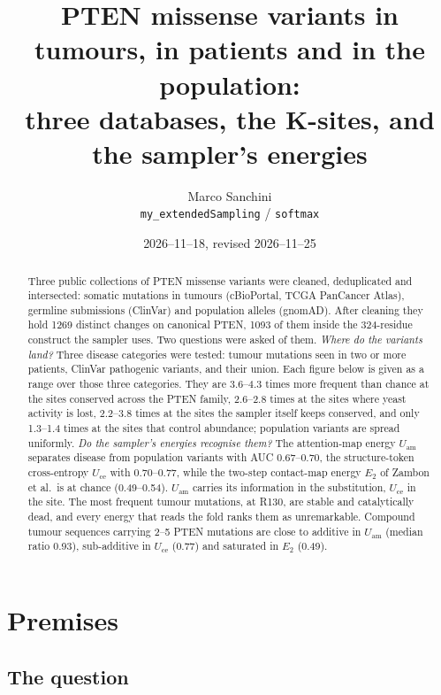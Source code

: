 \documentclass[11pt,a4paper]{article}
\title{PTEN missense variants in tumours, in patients and in the population:\\
three databases, the K-sites, and the sampler's energies}
\author{Marco Sanchini \\ \small\texttt{my\_extendedSampling} / \texttt{softmax}}
\date{2026--11--18, revised 2026--11--25}
\newcommand{\Uam}{U_{\mathrm{am}}}
\newcommand{\Uce}{U_{\mathrm{ce}}}
\newcommand{\Etwo}{E_{2}}
\begin{document}
\maketitle

\begin{abstract}
\noindent
Three public collections of PTEN missense variants were cleaned, deduplicated
and intersected: somatic mutations in tumours (cBioPortal, TCGA PanCancer
Atlas), germline submissions (ClinVar) and population alleles (gnomAD). After
cleaning they hold 1269 distinct changes on canonical PTEN, 1093 of them inside
the 324-residue construct the sampler uses. Two questions were asked of them.
\emph{Where do the variants land?} Three disease categories were tested:
tumour mutations seen in two or more patients, ClinVar pathogenic variants,
and their union. Each figure below is given as a range over those three
categories. They are 3.6--4.3 times more frequent than chance at the sites
conserved across the PTEN family, 2.6--2.8 times at the sites where yeast
activity is lost, 2.2--3.8 times at the sites the sampler itself keeps
conserved, and only 1.3--1.4 times at the sites that control abundance;
population variants are spread uniformly. \emph{Do the sampler's energies
recognise them?} The attention-map energy $\Uam$ separates disease from
population variants with AUC 0.67--0.70, the structure-token cross-entropy
$\Uce$ with 0.70--0.77, while the two-step contact-map energy $\Etwo$ of Zambon
et al.\ is at chance (0.49--0.54). $\Uam$ carries its information in the
substitution, $\Uce$ in the site. The most frequent tumour mutations, at
R130, are stable and catalytically dead, and every energy that reads the fold
ranks them as unremarkable. Compound tumour sequences carrying 2--5 PTEN
mutations are close to additive in $\Uam$ (median ratio 0.93), sub-additive in
$\Uce$ (0.77) and saturated in $\Etwo$ (0.49).
\end{abstract}

\tableofcontents

\section{Premises}

\subsection{The question}
\end{document}

